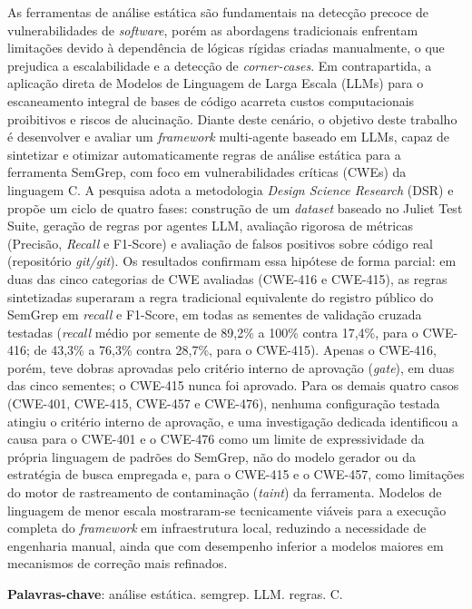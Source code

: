 \documentclass[
    12pt,                %
    openright,           %
    oneside,             %
    a4paper,             %
    english,             %
    brazil               %
]{abntex2}
\begin{document}
\begin{resumo}
  As ferramentas de análise estática são fundamentais na detecção precoce de vulnerabilidades de \textit{software}, porém as abordagens tradicionais enfrentam limitações devido à dependência de lógicas rígidas criadas manualmente, o que prejudica a escalabilidade e a detecção de \textit{corner-cases}. 
Em contrapartida, a aplicação direta de Modelos de Linguagem de Larga Escala (LLMs) para o escaneamento integral de bases de código acarreta custos computacionais proibitivos e riscos de alucinação. 
Diante deste cenário, o objetivo deste trabalho é desenvolver e avaliar um \textit{framework} multi-agente baseado em LLMs, capaz de sintetizar e otimizar automaticamente regras de análise estática para a ferramenta SemGrep, com foco em vulnerabilidades críticas (CWEs) da linguagem C. 
A pesquisa adota a metodologia \textit{Design Science Research} (DSR) e propõe um ciclo de quatro fases: construção de um \textit{dataset} baseado no Juliet Test Suite, geração de regras por agentes LLM, avaliação rigorosa de métricas (Precisão, \textit{Recall} e F1-Score) e avaliação de falsos positivos sobre código real (repositório \textit{git/git}).
Os resultados confirmam essa hipótese de forma parcial: em duas das cinco categorias de CWE avaliadas (CWE-416 e CWE-415), as regras sintetizadas superaram a regra tradicional equivalente do registro público do SemGrep em \textit{recall} e F1-Score, em todas as sementes de validação cruzada testadas (\textit{recall} médio por semente de 89,2\% a 100\% contra 17,4\%, para o CWE-416; de 43,3\% a 76,3\% contra 28,7\%, para o CWE-415).
Apenas o CWE-416, porém, teve dobras aprovadas pelo critério interno de aprovação (\textit{gate}), em duas das cinco sementes; o CWE-415 nunca foi aprovado.
Para os demais quatro casos (CWE-401, CWE-415, CWE-457 e CWE-476), nenhuma configuração testada atingiu o critério interno de aprovação, e uma investigação dedicada identificou a causa para o CWE-401 e o CWE-476 como um limite de expressividade da própria linguagem de padrões do SemGrep, não do modelo gerador ou da estratégia de busca empregada e, para o CWE-415 e o CWE-457, como limitações do motor de rastreamento de contaminação (\textit{taint}) da ferramenta. Modelos de linguagem de menor escala mostraram-se tecnicamente viáveis para a execução completa do \textit{framework} em infraestrutura local, reduzindo a necessidade de engenharia manual, ainda que com desempenho inferior a modelos maiores em mecanismos de correção mais refinados.

\vspace{\onelineskip}
\noindent
\textbf{Palavras-chave}: análise estática. semgrep. LLM. regras. C.
\end{resumo}
\end{document}
